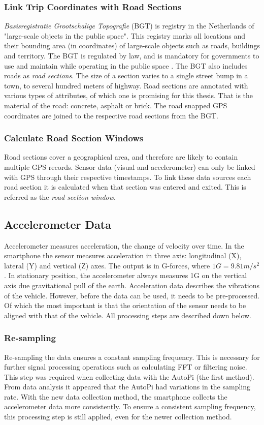 \subsubsection{Link Trip Coordinates with Road Sections}
\textit{Basisregistratie Grootschalige Topografie} (BGT) is registry in the Netherlands of "large-scale objects in the public space". This registry marks all locations and their bounding area (in coordinates) of large-scale objects such as roads, buildings and territory. The BGT is regulated by law, and is mandatory for governments to use and maintain while operating in the public space \cite{BGT}. The BGT also includes roads as \textit{road sections}. The size of a section varies to a single street bump in a town, to several hundred meters of highway. Road sections are annotated with various types of attributes, of which one is promising for this thesis. That is the material of the road: concrete, asphalt or brick. The road snapped GPS coordinates are joined to the respective road sections from the BGT.


\subsubsection{Calculate Road Section Windows}
Road sections cover a geographical area, and therefore are likely to contain multiple GPS records. Sensor data (visual and accelerometer) can only be linked with GPS through their respective timestamps. To link these data sources each road section it is calculated when that section was entered and exited. This is referred as the \textit{road section window}.

\subsection{Accelerometer Data}
Accelerometer measures acceleration, the change of velocity over time. In the smartphone the sensor measures acceleration in three axis: longitudinal (X), lateral (Y) and vertical (Z) axes. The output is in G-forces, where $1 G = 9.81m/s^2$. In stationary position, the accelerometer always measures 1G on the vertical axis due gravitational pull of the earth. Acceleration data describes the vibrations of the vehicle. However, before the data can be used, it needs to be pre-processed. Of which the most important is that the orientation of the sensor needs to be aligned with that of the vehicle. All processing steps are described down below.


\subsubsection{Re-sampling}
Re-sampling the data ensures a constant sampling frequency. This is necessary for further signal processing operations such as calculating FFT or filtering noise. This step was required when collecting data with the AutoPi (the first method). From data analysis it appeared that the AutoPi had variations in the sampling rate. With the new data collection method, the smartphone collects the accelerometer data more consistently. To ensure a consistent sampling frequency, this processing step is still applied, even for the newer collection method.

